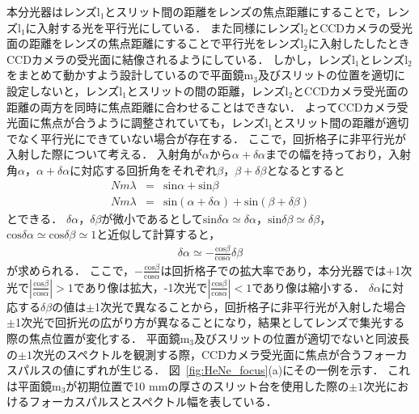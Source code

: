 本分光器はレンズ$\mathrm{l_1}$とスリット間の距離をレンズの焦点距離にすることで，レンズ$\mathrm{l_1}$に入射する光を平行光にしている．
また同様にレンズ$\mathrm{l_2}$とCCDカメラの受光面の距離をレンズの焦点距離にすることで平行光をレンズ$\mathrm{l_2}$に入射したしたときCCDカメラの受光面に結像されるようにしている．
しかし，レンズ$\mathrm{l_1}$とレンズ$\mathrm{l_2}$をまとめて動かすよう設計しているので平面鏡$\mathrm{m_3}$及びスリットの位置を適切に設定しないと，レンズ$\mathrm{l_1}$とスリットの間の距離，レンズ$\mathrm{l_2}$とCCDカメラ受光面の距離の両方を同時に焦点距離に合わせることはできない．
よってCCDカメラ受光面に焦点が合うように調整されていても，レンズ$\mathrm{l_1}$とスリット間の距離が適切でなく平行光にできていない場合が存在する．
ここで，回折格子に非平行光が入射した際について考える．
入射角が$\alpha$から$\alpha+\delta\alpha$までの幅を持っており，入射角$\alpha$，$\alpha+\delta\alpha$に対応する回折角をそれぞれ$\beta$，$\beta+\delta\beta$となるとすると
\begin{eqnarray}
    Nm\lambda &=& \mathrm{sin}{\alpha}+\mathrm{sin}{\beta} \\
    Nm\lambda &=& \mathrm{sin}{(\alpha+\delta\alpha)}+\mathrm{sin}{(\beta+\delta\beta)}
\end{eqnarray}
とできる．
$\delta\alpha$，$\delta\beta$が微小であるとして$\mathrm{sin}{\delta\alpha}\simeq\delta\alpha，\mathrm{sin}{\delta\beta}\simeq\delta\beta$，$\mathrm{cos}{\delta\alpha}\simeq\mathrm{cos}{\delta\beta}\simeq1$と近似して計算すると，
\begin{eqnarray}
    \delta\alpha\simeq-\frac{\mathrm{cos}{\beta}}{\mathrm{cos}{\alpha}}\delta\beta
\end{eqnarray}
が求められる．
ここで，$-\frac{\mathrm{cos}{\beta}}{\mathrm{cos}{\alpha}}$は回折格子での拡大率であり，本分光器では+1次光で$|\frac{\mathrm{cos}{\beta}}{\mathrm{cos}{\alpha}}|>1$であり像は拡大，-1次光で$|\frac{\mathrm{cos}{\beta}}{\mathrm{cos}{\alpha}}|<1$であり像は縮小する．
$\delta\alpha$に対応する$\delta\beta$の値は$\pm{}$1次光で異なることから，回折格子に非平行光が入射した場合$\pm{}$1次光で回折光の広がり方が異なることになり，結果としてレンズで集光する際の焦点位置が変化する．
平面鏡$\mathrm{m_3}$及びスリットの位置が適切でないと同波長の$\pm{1}$次光のスペクトルを観測する際，CCDカメラ受光面に焦点が合うフォーカスパルスの値にずれが生じる．
図\ \ref{fig:HeNe_focus}(a)にその一例を示す．
これは平面鏡$\mathrm{m_3}$が初期位置で10 mmの厚さのスリット台を使用した際の$\pm{1}$次光におけるフォーカスパルスとスペクトル幅を表している．

